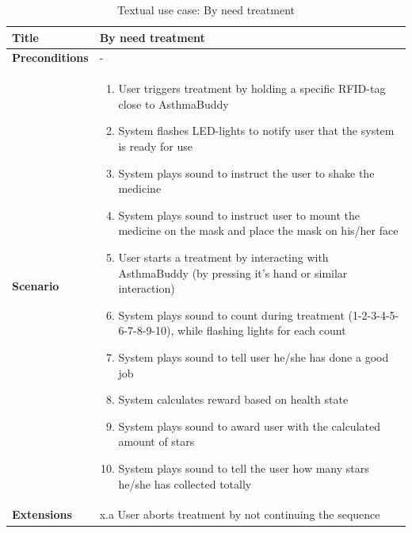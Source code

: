\begin{table}[H]
\begin{tabular}{|p{4.0cm} | p{9.0cm} |}
\hline
\textbf{Title} & By need treatment \\
\hline
\textbf{Preconditions} & - \\
\hline 
\textbf{Scenario} & 
	\begin{enumerate}
	  \itemsep0em
	  \item User triggers treatment by holding a specific RFID-tag close to AsthmaBuddy
	  \item System flashes LED-lights to notify user that the system is ready for use
	  \item System plays sound to instruct the user to shake the medicine
	  \item System plays sound to instruct user to mount the medicine on the mask and place the mask on his/her face
	  \item User starts a treatment by interacting with AsthmaBuddy (by pressing it's hand or similar interaction)
	  \item System plays sound to count during treatment (1-2-3-4-5-6-7-8-9-10), while flashing lights for each count
	  \item System plays sound to tell user he/she has done a good job
	  \item System calculates reward based on health state
	  \item System plays sound to award user with the calculated amount of stars
	  \item System plays sound to tell the user how many stars he/she has collected totally
	\end{enumerate}
\\
\hline
	\textbf{Extensions} & 
		x.a User aborts treatment by not continuing the sequence
\\
\hline
\end{tabular}
\caption{Textual use case: By need treatment}
\label{tab:textual-use-case}
\end{table}



